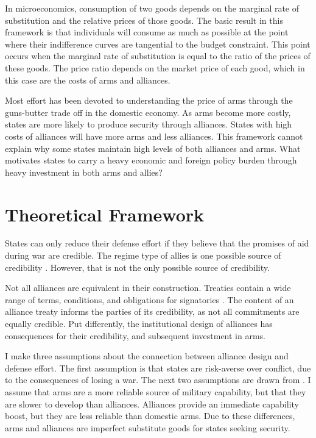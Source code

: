 \documentclass[12pt]{article}
\begin{document}
In microeconomics, consumption of two goods depends on the marginal rate of substitution and the relative prices of those goods. The basic result in this framework is that individuals will consume as much as possible at the point where their indifference curves are tangential to the budget constraint. This point occurs when the marginal rate of substitution is equal to the ratio of the prices of these goods. The price ratio depends on the market price of each good, which in this case are the costs of arms and alliances. 

Most effort has been devoted to understanding the price of arms through the guns-butter trade off in the domestic economy. As arms become more costly, states are more likely to produce security through alliances. States with high costs of alliances will have more arms and less alliances. This framework cannot explain why some states maintain high levels of both alliances and arms. What motivates states to carry a heavy economic and foreign policy burden through heavy investment in both arms and allies? 

\section*{Theoretical Framework} 

States can only reduce their defense effort if they believe that the promises of aid during war are credible. The regime type of allies is one possible source of credibility \citep{DigiuseppePoast2016}. However, that is not the only possible source of credibility. 

Not all alliances are equivalent in their construction. Treaties contain a wide range of terms, conditions, and obligations for signatories \citep{Benson2011, Chibaetal2015}. The content of an alliance treaty informs the parties of its credibility, as not all commitments are equally credible. Put differently, the institutional design of alliances has consequences for their credibility, and subsequent investment in arms. 

I make three assumptions about the connection between alliance design and defense effort. The first assumption is that states are risk-averse over conflict, due to the consequences of losing a war. The next two assumptions are drawn from \citep{Morrow1993}. I assume that arms are a more reliable source of military capability, but that they are slower to develop than alliances. Alliances provide an immediate capability boost, but they are less reliable than domestic arms. Due to these differences, arms and alliances are imperfect substitute goods for states seeking security. 
\end{document}
